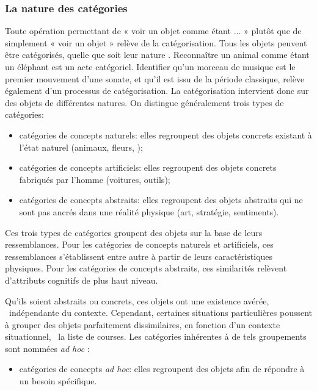 \subsubsection{La nature des catégories}

Toute opération permettant de « voir un objet comme étant $\ldots$ » plutôt que de simplement « voir un objet » relève de la catégorisation. Tous les objets peuvent être catégorisés, quelle que soit leur nature \citep{goldstone2003concepts}. Reconnaître un animal comme étant un éléphant est un acte catégoriel. Identifier qu'un morceau de musique est le premier mouvement d'une sonate, et qu'il est issu de la période classique, relève également d'un processus de catégorisation. La catégorisation intervient donc sur des objets de différentes natures. On distingue généralement trois types de catégories:

\begin{itemize}
\item catégories de concepts naturels: elles regroupent des objets concrets existant à l'état naturel (animaux, fleurs, \etc);
\item catégories de concepts artificiels: elles regroupent des objets concrets fabriqués par l'homme (voitures, outils);
\item catégories de concepts abstraits: elles regroupent des objets abstraits qui ne sont pas ancrés dans une réalité physique (art, stratégie, sentiments).
\end{itemize}

Ces trois types de catégories groupent des objets sur la base de leurs ressemblances. Pour les catégories de concepts naturels et artificiels, ces ressemblances s'établissent entre autre à partir de leurs caractéristiques physiques. Pour les catégories de concepts abstraits, ces similarités relèvent d'attributs cognitifs de plus haut niveau. 

Qu'ils soient abstraits ou concrets, ces objets ont une existence avérée, \ie~indépendante du contexte. Cependant, certaines situations particulières poussent à grouper des objets parfaitement dissimilaires, en fonction d'un contexte situationnel, \eg~la liste de courses. Les catégories inhérentes à de tels groupements sont nommées \emph{ad hoc} \citep{barsalou1983ad}:

\begin{itemize}
 \item catégories de concepts \emph{ad hoc}: elles regroupent des objets afin de répondre à un besoin spécifique.
\end{itemize}

